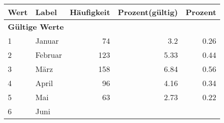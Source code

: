      \begin{longtable}{lXrrr}
     \toprule
     \textbf{Wert} & \textbf{Label} & \textbf{Häufigkeit} & \textbf{Prozent(gültig)} & \textbf{Prozent} \\
     \endhead
     \midrule
     \multicolumn{5}{l}{\textbf{Gültige Werte}}\\

     1 &
     \multicolumn{1}{X}{ Januar   } &


       \num{74} &
       \num[round-mode=places,round-precision=2]{3.2} &
         \num[round-mode=places,round-precision=2]{0.26} \\

     2 &
     \multicolumn{1}{X}{ Februar   } &


       \num{123} &
       \num[round-mode=places,round-precision=2]{5.33} &
         \num[round-mode=places,round-precision=2]{0.44} \\

     3 &
     \multicolumn{1}{X}{ März   } &


       \num{158} &
       \num[round-mode=places,round-precision=2]{6.84} &
         \num[round-mode=places,round-precision=2]{0.56} \\

     4 &
     \multicolumn{1}{X}{ April   } &


       \num{96} &
       \num[round-mode=places,round-precision=2]{4.16} &
         \num[round-mode=places,round-precision=2]{0.34} \\

     5 &
     \multicolumn{1}{X}{ Mai   } &


       \num{63} &
       \num[round-mode=places,round-precision=2]{2.73} &
         \num[round-mode=places,round-precision=2]{0.22} \\

     6 &
     \multicolumn{1}{X}{ Juni   } &



\end{longtable}
